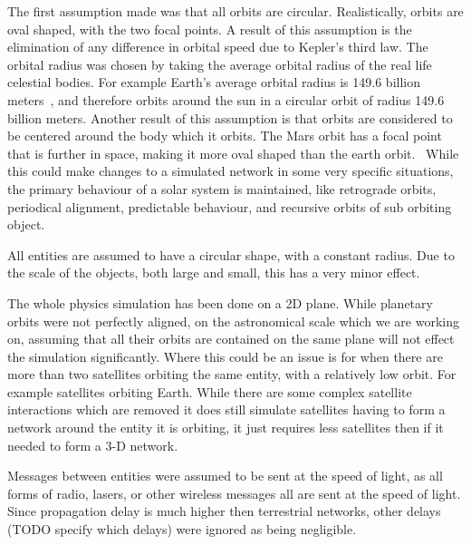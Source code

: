 \documentclass[a4paper,12pt]{article}
\begin{document}
The first assumption made was that all orbits are circular. Realistically,
orbits are oval shaped, with the two focal points. A result of this assumption
is the elimination of any difference in orbital speed due to Kepler's third law.
The orbital radius was chosen by taking the average orbital radius of the real
life celestial bodies. For example Earth's average orbital radius is 149.6
billion meters~\cite{}, and therefore orbits around the sun in a circular orbit
of radius 149.6 billion meters. Another result of this assumption is that orbits
are considered to be centered around the body which it orbits. The Mars orbit
has a focal point that is further in space, making it more oval shaped than the
earth orbit.~\cite{} While this could make changes to a simulated network in
some very specific situations, the primary behaviour of a solar system is
maintained, like retrograde orbits, periodical alignment, predictable behaviour,
and recursive orbits of sub orbiting object.

All entities are assumed to have a circular shape, with a constant radius. Due
to the scale of the objects, both large and small, this has a very minor effect.

The whole physics simulation has been done on a 2D plane. While planetary orbits
were not perfectly aligned, on the astronomical scale which we are working on,
assuming that all their orbits are contained on the same plane will not effect
the simulation significantly. Where this could be an issue is for when there are
more than two satellites orbiting the same entity, with a relatively low orbit.
For example satellites orbiting Earth. While there are some complex satellite
interactions which are removed it does still simulate satellites having to form
a network around the entity it is orbiting, it just requires less satellites
then if it needed to form a 3-D network.

Messages between entities were assumed to be sent at the speed of light, as all
forms of radio, lasers, or other wireless messages all are sent at the speed of
light. Since propagation delay is much higher then terrestrial networks, other
delays (TODO specify which delays) were ignored as being negligible.
\end{document}
